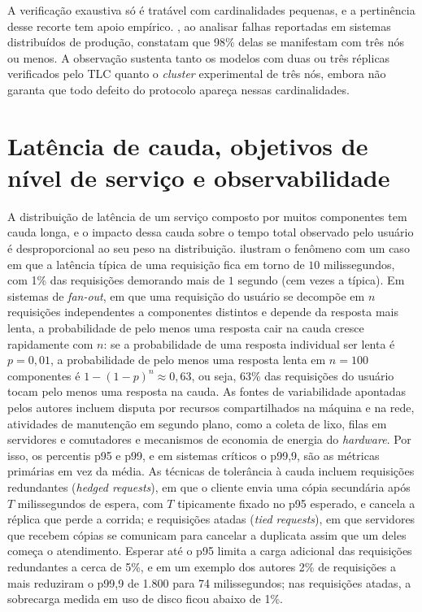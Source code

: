 A verificação exaustiva só é tratável com cardinalidades pequenas, e a pertinência desse recorte tem apoio empírico. \citet{yuan_simple_testing_2014}, ao analisar falhas reportadas em sistemas distribuídos de produção, constatam que 98\% delas se manifestam com três nós ou menos. A observação sustenta tanto os modelos com duas ou três réplicas verificados pelo TLC quanto o \emph{cluster} experimental de três nós, embora não garanta que todo defeito do protocolo apareça nessas cardinalidades.

\section{Latência de cauda, objetivos de nível de serviço e observabilidade}
\label{sec-fund-slo}

A distribuição de latência de um serviço composto por muitos componentes tem cauda longa, e o impacto dessa cauda sobre o tempo total observado pelo usuário é desproporcional ao seu peso na distribuição. \citet{dean_barroso_tail_2013} ilustram o fenômeno com um caso em que a latência típica de uma requisição fica em torno de $10$ milissegundos, com 1\% das requisições demorando mais de $1$ segundo (cem vezes a típica). Em sistemas de \emph{fan-out}, em que uma requisição do usuário se decompõe em $n$ requisições independentes a componentes distintos e depende da resposta mais lenta, a probabilidade de pelo menos uma resposta cair na cauda cresce rapidamente com $n$: se a probabilidade de uma resposta individual ser lenta é $p = 0{,}01$, a probabilidade de pelo menos uma resposta lenta em $n = 100$ componentes é $1 - (1-p)^n \approx 0{,}63$, ou seja, 63\% das requisições do usuário tocam pelo menos uma resposta na cauda. As fontes de variabilidade apontadas pelos autores incluem disputa por recursos compartilhados na máquina e na rede, atividades de manutenção em segundo plano, como a coleta de lixo, filas em servidores e comutadores e mecanismos de economia de energia do \emph{hardware}. Por isso, os percentis p95 e p99, e em sistemas críticos o p99,9, são as métricas primárias em vez da média. As técnicas de tolerância à cauda incluem requisições redundantes (\emph{hedged requests}), em que o cliente envia uma cópia secundária após $T$ milissegundos de espera, com $T$ tipicamente fixado no p95 esperado, e cancela a réplica que perde a corrida; e requisições atadas (\emph{tied requests}), em que servidores que recebem cópias se comunicam para cancelar a duplicata assim que um deles começa o atendimento. Esperar até o p95 limita a carga adicional das requisições redundantes a cerca de 5\%, e em um exemplo dos autores 2\% de requisições a mais reduziram o p99,9 de 1.800 para 74 milissegundos; nas requisições atadas, a sobrecarga medida em uso de disco ficou abaixo de 1\%.

